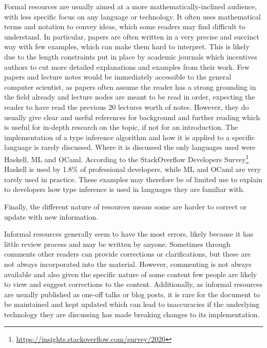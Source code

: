 \documentclass[a4paper,fleqn,oneside,12pt]{report}
\begin{document}
Formal resources are usually aimed at a more mathematically-inclined audience, with less specific focus on any language or technology. It often uses mathematical terms and notation to convey ideas, which some readers may find difficult to understand. In particular, papers are often written in a very precise and succinct way with few examples, which can make them hard to interpret. This is likely due to the length constraints put in place by academic journals which incentives authors to cut more detailed explanations and examples from their work. Few papers and lecture notes would be immediately accessible to the general computer scientist, as papers often assume the reader has a strong grounding in the field already and lecture nodes are meant to be read in order, expecting the reader to have read the previous 20 lectures worth of notes. However, they do usually give clear and useful references for background and further reading which is useful for in-depth research on the topic, if not for an introduction. The implementation of a type inference algorithm and how it is applied to a specific language is rarely discussed. Where it is discussed the only languages used were Haskell, ML and OCaml. According to the StackOverflow Developers Survey\footnote{\underline{\href{https://insights.stackoverflow.com/survey/2020\#technology-programming-scripting-and-markup-languages}{https://insights.stackoverflow.com/survey/2020}}} Haskell is used by 1.8\% of professional developers, while ML and OCaml are very rarely used in practice. These examples may therefore be of limited use to explain to developers how type inference is used in languages they are familiar with.



Finally, the different nature of resources means some are harder to correct or update with new information.

Informal resources generally seem to have the most errors, likely because it has little review process and may be written by anyone. Sometimes through comments other readers can provide corrections or clarifications, but these are not always incorporated into the material. However, commenting is not always available and also given the specific nature of some content few people are likely to view and suggest corrections to the content. Additionally, as informal resources are usually published as one-off talks or blog posts, it is rare for the document to be maintained and kept updated which can lead to inaccuracies if the underlying technology they are discussing has made breaking changes to its implementation.
\end{document}
